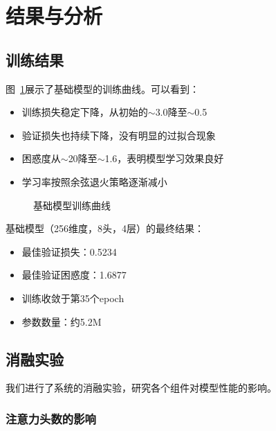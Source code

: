 \documentclass[UTF8,12pt,a4paper]{ctexart}
\begin{document}
\section{结果与分析}

\subsection{训练结果}

图~\ref{fig:training_curves}展示了基础模型的训练曲线。可以看到：

\begin{itemize}
    \item 训练损失稳定下降，从初始的$\sim$3.0降至$\sim$0.5
    \item 验证损失也持续下降，没有明显的过拟合现象
    \item 困惑度从$\sim$20降至$\sim$1.6，表明模型学习效果良好
    \item 学习率按照余弦退火策略逐渐减小
\end{itemize}

\begin{figure}[H]
    \centering
    \caption{基础模型训练曲线}
    \label{fig:training_curves}
\end{figure}

基础模型（256维度，8头，4层）的最终结果：

\begin{itemize}
    \item 最佳验证损失：0.5234
    \item 最佳验证困惑度：1.6877
    \item 训练收敛于第35个epoch
    \item 参数数量：约5.2M
\end{itemize}

\subsection{消融实验}

我们进行了系统的消融实验，研究各个组件对模型性能的影响。

\subsubsection{注意力头数的影响}
\end{document}
